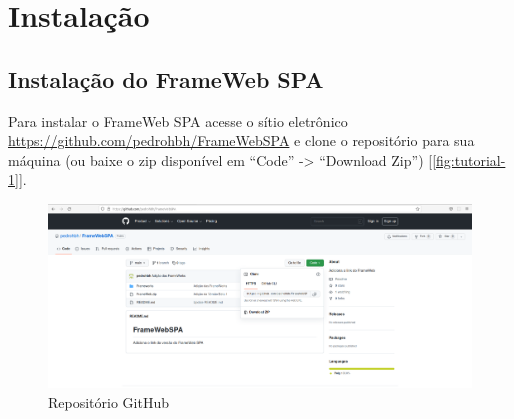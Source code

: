 \documentclass[
article,			%
11pt,				%
oneside,			%
a4paper,			%
english,			%
brazil,				%
sumario=tradicional
]{abntex2}
\begin{document}
	
	
	\frenchspacing 
	
	
	
	\maketitle
	
	
	
	\textual
	
\section{Instalação}
	
\subsection{Instalação do FrameWeb SPA}
Para instalar o FrameWeb SPA acesse o sítio eletrônico \url{https://github.com/pedrohbh/FrameWebSPA} e clone o repositório para sua máquina (ou baixe o zip disponível em ``Code'' -> ``Download Zip'') [\autoref{fig:tutorial-1}].

\begin{figure}
	\centering
	\includegraphics[width=\linewidth]{"figuras/Tutorial 1"}
	\caption{Repositório GitHub}
	\label{fig:tutorial-1}
\end{figure}
\end{document}
